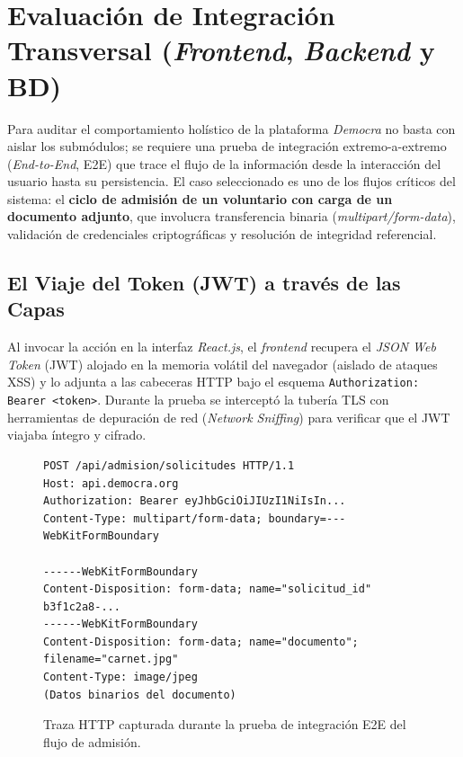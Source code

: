 \section{Evaluaci\'on de Integraci\'on Transversal (\textit{Frontend}, \textit{Backend} y BD)}

Para auditar el comportamiento hol\'istico de la plataforma \textit{Democra} no
basta con aislar los subm\'odulos; se requiere una prueba de integraci\'on
extremo-a-extremo (\textit{End-to-End}, E2E) que trace el flujo de la informaci\'on
desde la interacci\'on del usuario hasta su persistencia. El caso seleccionado es
uno de los flujos cr\'iticos del sistema: el \textbf{ciclo de admisi\'on de un
voluntario con carga de un documento adjunto}, que involucra transferencia binaria
(\textit{multipart/form-data}), validaci\'on de credenciales criptogr\'aficas y
resoluci\'on de integridad referencial.

\subsection{El Viaje del Token (JWT) a trav\'es de las Capas}

Al invocar la acci\'on en la interfaz \textit{React.js}, el \textit{frontend}
recupera el \textit{JSON Web Token} (JWT) alojado en la memoria vol\'atil del
navegador (aislado de ataques XSS) y lo adjunta a las cabeceras HTTP bajo el esquema
\texttt{Authorization: Bearer <token>}. Durante la prueba se intercept\'o la
tuber\'ia TLS con herramientas de depuraci\'on de red (\textit{Network Sniffing})
para verificar que el JWT viajaba \'integro y cifrado.

\begin{figure}[htpb]
\centering
\begin{minipage}{0.9\textwidth}
\footnotesize
\begin{verbatim}
POST /api/admision/solicitudes HTTP/1.1
Host: api.democra.org
Authorization: Bearer eyJhbGciOiJIUzI1NiIsIn...
Content-Type: multipart/form-data; boundary=---WebKitFormBoundary

------WebKitFormBoundary
Content-Disposition: form-data; name="solicitud_id"
b3f1c2a8-...
------WebKitFormBoundary
Content-Disposition: form-data; name="documento"; filename="carnet.jpg"
Content-Type: image/jpeg
(Datos binarios del documento)
\end{verbatim}
\end{minipage}
\caption{Traza HTTP capturada durante la prueba de integraci\'on E2E del flujo de admisi\'on.}
\label{fig:traza_http}
\end{figure}

